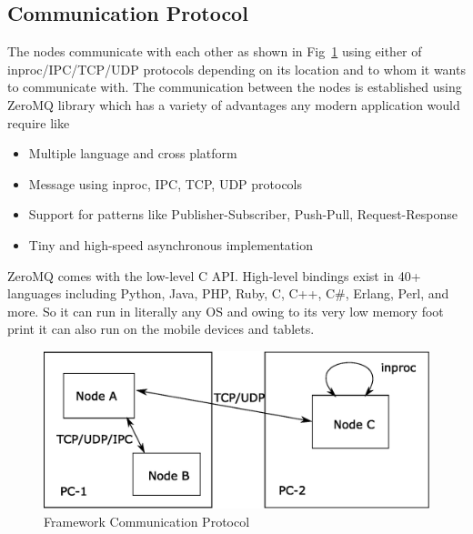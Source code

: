 \subsection{Communication Protocol}	
	The nodes communicate with each other as shown in Fig~\ref{fig:framework} using either of inproc/IPC/TCP/UDP protocols depending on its location and to whom it wants to communicate with. The communication between the nodes is established using ZeroMQ \cite{ZeroMQ} library which has a variety of advantages any modern application would require like  
\begin{itemize}
\item Multiple language and cross platform
\item Message using inproc, IPC, TCP, UDP protocols
\item Support for patterns like Publisher-Subscriber, Push-Pull, Request-Response
\item Tiny and high-speed asynchronous implementation
\end{itemize}
	ZeroMQ comes with the low-level C API. High-level bindings exist in 40+ languages including Python, Java, PHP, Ruby, C, C++, C\#, Erlang, Perl, and more. So it can run in literally any OS and owing to its very low memory foot print it can also run on the mobile devices and tablets.
\begin{figure}
\centering
\includegraphics[width=\textwidth]{assets/architecture_comm.eps}
\caption[Framework Communication Protocol]{Framework Communication Protocol}
\label{fig:framework}
\end{figure}
